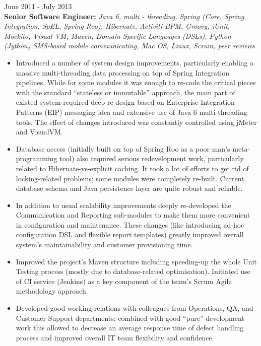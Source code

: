\documentclass{res}
\begin{document}
\begin{resume}
 \hfill        June 2011 - July 2013 \\
{\bf Senior Software Engineer:} {\em Java 6, multi - threading, Spring (Core, Spring Integration, SpEL, Spring Roo), Hibernate, Activiti BPM, Groovy, jUnit, Mockito, Visual VM, Maven, Domain-Specific Languages (DSLs), Python (Jython) SMS-based mobile communicating, Mac OS, Linux, Scrum, peer reviews}
\begin{itemize} \itemsep -2pt %
 \item Introduced a number of system design improvements, particularly enabling a massive multi-threading data processing on top of Spring Integration pipelines. While for some modules it was enough to re-code the critical pieces with the standard “stateless or immutable” approach, the main part of existed system required deep re-design based on Enterprise Integration Patterns (EIP) messaging idea and extensive use of Java 6 multi-threading tools. The effect of changes introduced was constantly controlled using jMeter and VisualVM.
 \item Database access (initially built on top of Spring Roo as a poor man's meta-programming tool) also required serious redevelopment work, particularly related to Hibernate-vs-explicit caching. It took a lot of efforts to get rid of locking-related problems; some modules were completely re-built. Current database schema and Java persistence layer are quite robust and reliable.
 \item In addition to usual scalability improvements deeply re-developed the Communication and Reporting sub-modules to make them more convenient in configuration and maintenance. These changes (like introducing ad-hoc configuration DSL and flexible report templates) greatly improved overall system's maintainability and customer provisioning time.
 \item 	Improved the project’s Maven structure including speeding-up the whole Unit Testing process (mostly due to database-related optimisation). Initiated use of CI service (Jenkins) as a key component of the team’s Scrum Agile methodology approach.
 \item Developed good working relations with colleagues from Operations, QA, and Customer Support departments; combined with good ``pure'' development work this allowed to decrease an average response time of defect handling process and improved overall IT team flexibility and confidence.
\end{itemize}


\end{resume}
\end{document}
